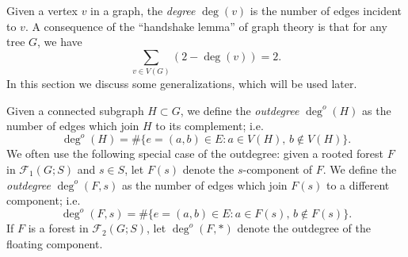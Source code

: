 \documentclass{amsart}
\theoremstyle{definition}
\newcommand{\forests}{\mathcal{F}}
\newcommand{\degout}{\deg^o}
\begin{document}
Given a vertex $v$ in a graph, the {\em degree} $\deg(v)$ is the number of edges incident to $v$.
A consequence of the ``handshake lemma'' of graph theory is that for any tree $G$, we have
\[
\sum_{v \in V(G)} (2 - \deg(v)) = 2.
\]
In this section we discuss some generalizations, which will be used later.

Given a connected subgraph $H \subset G$,
we define the {\em outdegree} $\degout(H)$ as the number of edges which join $H$ to its complement; i.e.
\begin{equation}
\label{eq:outdeg}
	\degout(H) = \#\{ e = (a,b) \in E : a \in V(H),\, b \not\in V(H)\}.
\end{equation}
We often use the following special case of the outdegree: given a rooted forest $F$ in $\forests_1(G;S)$ and $s \in S$,
let $F(s)$ denote the $s$-component of $F$.
We define the {\em outdegree} $\degout(F,s)$ as the number of edges which join $F(s)$ to a different component; i.e.
\begin{equation}
\label{eq:outdeg-forest}
	\degout(F,s) = \#\{ e = (a,b) \in E : a \in F(s),\, b \not\in F(s)\}.
\end{equation}
If $F$ is a forest in $\forests_2(G;S)$, let $\degout(F,*)$ denote the outdegree of the floating component.
\end{document}

